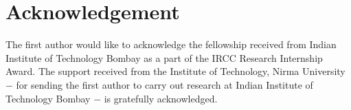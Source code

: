 \documentclass[preprint,12pt]{elsarticle}
\begin{document}
\section*{Acknowledgement}

The first author would like to acknowledge the fellowship received from Indian Institute of Technology Bombay as a part of the IRCC Research Internship Award. The support received from the Institute of Technology, Nirma University
$-$ for sending the first author to carry out research at Indian
Institute of Technology Bombay $-$ is gratefully acknowledged.
   
  

\nocite{*}






\end{document}
